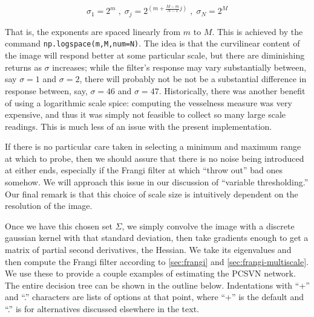     \begin{equation}
    \sigma_1 = 2^{m} \; , \; \sigma_{j} = 2^{\left(m+\frac{M-m}{N-1}j\right)} \; , \; \sigma_N = 2^{M} \end{equation}
    
    That is, the exponents are spaced linearly from $m$ to $M$. This is achieved by the command
    \texttt{np.logspace(m,M,num=N)}. The idea is that the curvilinear content of the image will respond better at some particular scale, but there are diminishing returns as $\sigma$ increases; while the filter's response may vary substantially between, say $\sigma=1$ and $\sigma=2$, there will probably not be not be a substantial difference in response between, say, $\sigma=46$ and $\sigma=47$. Historically, there was another benefit of using a logarithmic scale spice: computing the vesselness measure was very expensive, and thus it was simply not feasible to collect so many large scale readings. This is much less of an issue with the present implementation.
    
    If there is no particular care taken in selecting a minimum and maximum range at which to probe, then we should assure that there is no noise being introduced at either ends, especially if the Frangi filter at which ``throw out'' bad ones somehow. We will approach this issue in our discussion of ``variable thresholding.'' Our final remark is that this choice of scale size is intuitively dependent on the resolution of the image.
    
    Once we have this chosen set $\Sigma$, we simply convolve the image with a discrete gaussian kernel with that standard deviation, then take gradients enough to get a matrix of partial second derivatives, the Hessian. We take its eigenvalues and then compute the Frangi filter according to \cref{sec:frangi} and \cref{sec:frangi-multiscale}. We use these to provide a couple examples of estimating the PCSVN network. The entire decision tree can be shown in the outline below. Indentations with ``+'' and ``.'' characters are lists of options at that point, where ``+'' is the default and ``.'' is for alternatives discussed elsewhere in the text.
    
